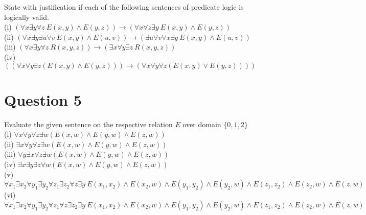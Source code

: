 \documentclass[12pt]{fphw}
\begin{document}
\begin{problem}
  State with justification if each of the following sentences of predicate logic is logically valid. \\
  (i) $(\forall x \exists y \forall z \ E(x,y) \wedge E(y,z)) \to (\forall x \forall z \exists y \ E(x,y) \wedge E(y,z))$ \\
  (ii) $(\forall x \exists y \exists u \forall v \ E(x,y) \wedge E(u,v)) \to (\exists u \forall v \forall x \exists y \ E(x,y) \wedge E(u,v))$ \\
  (iii) $(\forall x \exists y \forall z \ R(x,y,z)) \to (\exists x \forall y \exists z \ R(x,y,z))$ \\
  (iv) $((\forall x \forall y \exists z (E(x,y) \wedge E(y,z))) \to (\forall x \forall y \forall z (E(x,y) \vee E(y,z))))$
\end{problem}

\section*{Question 5}

\begin{problem}
  Evaluate the given sentence on the respective relation $E$ over domain $\{0,1,2\}$ \\
  (i) $\forall x \forall y \forall z \exists w (E(x,w) \wedge E(y,w) \wedge E(z,w))$ \\
  (ii) $\exists x \forall y \forall z \exists w (E(x,w) \wedge E(y,w) \wedge E(z,w))$ \\
  (iii) $\forall y \exists x \forall z \exists w (E(x,w) \wedge E(y,w) \wedge E(z,w))$ \\
  (iv) $\exists x \exists y \exists z \forall w (E(x,w) \wedge E(y,w) \wedge E(z,w))$ \\
  (v) $\forall x_1 \exists x_2 \forall y_1 \exists y_2 \forall z_1 \exists z_2 \forall z \exists y \ E(x_1, x_2) \wedge E(x_2, w) \wedge E(y_1, y_2) \wedge E(y_2, w) \wedge E(z_1, z_2) \wedge E(z_2, w) \wedge E(z,w)$ \\
  (vi) $\forall x_1 \exists x_2 \forall y_1 \exists y_2 \forall z_1 \forall z \exists z_2 \exists y \ E(x_1, x_2) \wedge E(x_2, w) \wedge E(y_1, y_2) \wedge E(y_2, w) \wedge E(z_1, z_2) \wedge E(z_2, w) \wedge E(z,w)$
\end{problem}
\end{document}

